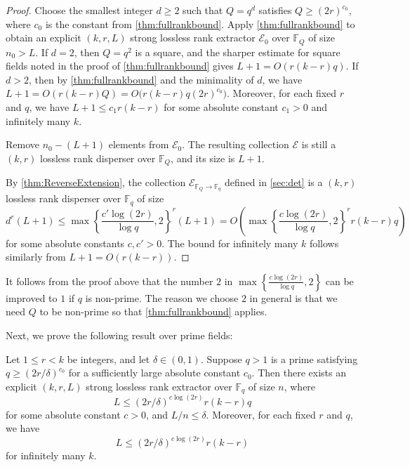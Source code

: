\documentclass[11pt]{article}
\newcommand{\F}{\mathbb{F}}
\begin{document}
\begin{proof}
Choose the smallest integer $d\geq 2$ such that $Q=q^d$ satisfies $Q\ge (2r)^{c_0}$, where $c_0$ is the constant from \cref{thm:fullrankbound}. 
Apply \cref{thm:fullrankbound} to obtain an explicit $(k,r,L)$ strong lossless rank extractor $\mathcal{E}_0$ over $\F_Q$ of size $n_0 > L$.  If $d=2$, then $Q=q^2$ is a square, and the sharper estimate for square fields noted in the proof of \cref{thm:fullrankbound} gives $L+1=O(r(k-r)q)$.
If $d>2$, then by \cref{thm:fullrankbound} and the minimality of $d$, we have $L+1=O(r(k-r)Q)
=O\bigl(r(k-r)q(2r)^{c_0}\bigr)$.
Moreover, for each fixed $r$ and $q$, we have $L+1 \le c_1 r(k-r)$ for some absolute constant $c_1>0$ and infinitely many $k$.

Remove $n_0-(L+1)$ elements from $\mathcal{E}_0$. The resulting collection $\mathcal{E}$ is still a $(k,r)$ lossless rank disperser over $\F_Q$, and its size is $L+1$.

By \cref{thm:ReverseExtension}, the collection $\mathcal{E}_{\F_Q\to \F_q}$ defined in \cref{sec:det} is a $(k,r)$ lossless rank disperser over $\F_q$ of size
\[
d^r (L+1) \le \max\left\{\frac{c'\log (2r)}{\log q},2\right\}^r (L+1)=O\!\left(\max\left\{\frac{c\log (2r)}{\log q},2\right\}^r r(k-r)q\right)
\]
for some absolute constants $c,c'>0$. The bound for infinitely many $k$ follows similarly from $L+1=O(r(k-r))$.
\end{proof}

\begin{remark}\label{remark:two}
It follows from the proof above that the number $2$ in $\max\left\{\frac{c\log (2r)}{\log q},2\right\}$ can be improved to $1$ if $q$ is non-prime. The reason we choose $2$ in general is that we need $Q$ to be non-prime so that \cref{thm:fullrankbound} applies.
\end{remark}

Next, we prove the following result over prime fields:

\begin{theorem}\label{thm:rankprime}
Let $1\le r<k$ be integers, and let $\delta\in (0,1)$.
Suppose $q>1$ is a prime satisfying $q\ge (2r/\delta)^{c_0}$ for a sufficiently large absolute constant $c_0$. Then there exists an explicit $(k,r,L)$ strong lossless rank extractor over $\F_q$ of size $n$, where 
\[
L\le (2r/\delta)^{c\log (2r)} r(k-r)q
\]
for some absolute constant $c>0$, and $L/n\le \delta$.
Moreover, for each fixed $r$ and $q$, we have 
\[
L\le (2r/\delta)^{c\log (2r)} r(k-r)
\]
for infinitely many $k$.
\end{theorem}
\end{document}
